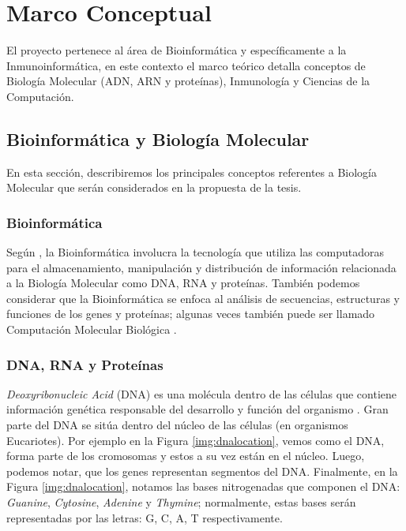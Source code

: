 \chapter{Marco Conceptual}
\label{cap:marcoteorico}


El proyecto pertenece al área de Bioinformática y específicamente a la Inmunoinformática, en este contexto el marco teórico detalla conceptos de Biología Molecular (ADN, ARN y proteínas), Inmunología y Ciencias de la Computación. 

\section{Bioinformática y Biología Molecular }

En esta sección, describiremos los principales conceptos referentes a Biología Molecular que serán considerados en la propuesta de la tesis.

\subsection{Bioinformática}

Según \cite{luscombe2001bioinformatics}, la Bioinformática involucra la tecnología que utiliza las computadoras para el almacenamiento, manipulación y distribución de información relacionada a la Biología Molecular como DNA, RNA y proteínas. También podemos considerar que la Bioinformática se enfoca al análisis de secuencias, estructuras y funciones de los genes y proteínas; algunas veces también puede ser llamado Computación Molecular Biológica \citep{xiong2006essential}.


\subsection{DNA, RNA y Proteínas}

\textit{Deoxyribonucleic Acid} (DNA) es una molécula dentro de las células que contiene información genética responsable del desarrollo y función del organismo \citep{NCIdictionary2022}. Gran parte del DNA se sitúa dentro del núcleo de las células (en organismos Eucariotes). Por ejemplo en la Figura \ref{img:dnalocation}, vemos como el DNA, forma parte de los cromosomas y estos a su vez están en el núcleo. Luego, podemos notar, que los genes representan segmentos del DNA. Finalmente, en la Figura \ref{img:dnalocation}, notamos las bases nitrogenadas que componen el DNA: \textit{Guanine}, \textit{Cytosine}, \textit{Adenine} y \textit{Thymine}; normalmente, estas bases serán representadas por las letras: G, C, A, T respectivamente.

